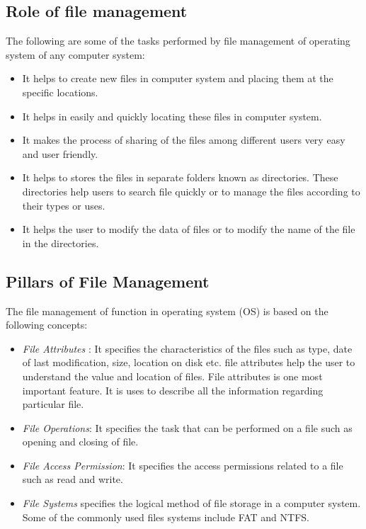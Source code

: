 \documentclass[12pt]{article}
\begin{document}
\subsection{Role of file management}
The following are some of the tasks performed by file management of operating system of any computer system:

\begin{itemize}
	\item It helps to create new files in computer system and placing them at the specific locations.	
	
	\item It helps in easily and quickly locating these files in computer system.
		
	\item It makes the process of sharing of the files among different users very easy and user friendly.
	
	\item It helps to stores the files in separate folders known as directories. These directories help users to search file quickly or to manage the files according to their types or uses.
	
	\item It helps the user to modify the data of files or to modify the name of the file in the directories.

\end{itemize}	

\subsection{Pillars of File Management}

The file management of function in operating system (OS) is based on the following concepts:

\begin{itemize}
	\item \emph{File Attributes} : It specifies the characteristics of the files such as type, date of last modification, size, location on disk etc. file attributes help the user to understand the value and location of files. File attributes is one most important feature. It is uses to describe all the information regarding particular file.	
	\item \emph{File Operations}: It specifies the task that can be performed on a file such as opening and closing of file.		
	\item \emph{File Access Permission}: It specifies the access permissions related to a file such as read and write.
		
	\item \emph{File Systems} specifies the logical method of file storage in a computer system. Some of the commonly used files systems include FAT and NTFS.
	
\end{itemize}	
\end{document}
